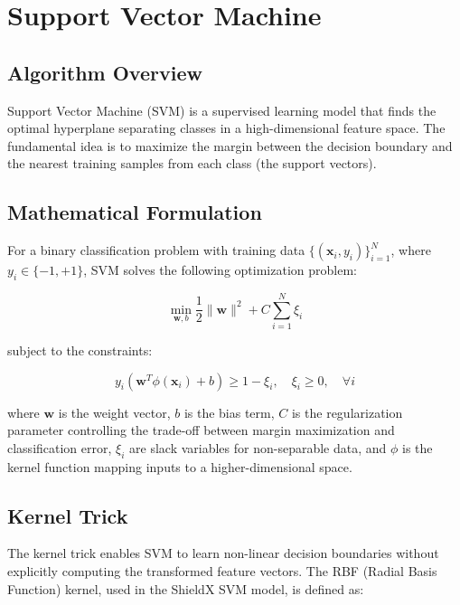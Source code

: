 \documentclass[../Main.tex]{subfiles}
\begin{document}
\section{Support Vector Machine}
\label{section:3.6}

\subsection{Algorithm Overview}

Support Vector Machine (SVM) \cite{cortes1995support} is a supervised learning model that finds the optimal hyperplane separating classes in a high-dimensional feature space. The fundamental idea is to maximize the margin between the decision boundary and the nearest training samples from each class (the support vectors).

\subsection{Mathematical Formulation}

For a binary classification problem with training data $\{(\mathbf{x}_i, y_i)\}_{i=1}^{N}$, where $y_i \in \{-1, +1\}$, SVM solves the following optimization problem:

\begin{equation}
\min_{\mathbf{w}, b} \frac{1}{2} \|\mathbf{w}\|^2 + C \sum_{i=1}^{N} \xi_i
\end{equation}

subject to the constraints:

\begin{equation}
y_i(\mathbf{w}^T \phi(\mathbf{x}_i) + b) \geq 1 - \xi_i, \quad \xi_i \geq 0, \quad \forall i
\end{equation}

where $\mathbf{w}$ is the weight vector, $b$ is the bias term, $C$ is the regularization parameter controlling the trade-off between margin maximization and classification error, $\xi_i$ are slack variables for non-separable data, and $\phi$ is the kernel function mapping inputs to a higher-dimensional space.

\subsection{Kernel Trick}

The kernel trick enables SVM to learn non-linear decision boundaries without explicitly computing the transformed feature vectors. The RBF (Radial Basis Function) kernel, used in the ShieldX SVM model, is defined as:
\end{document}
